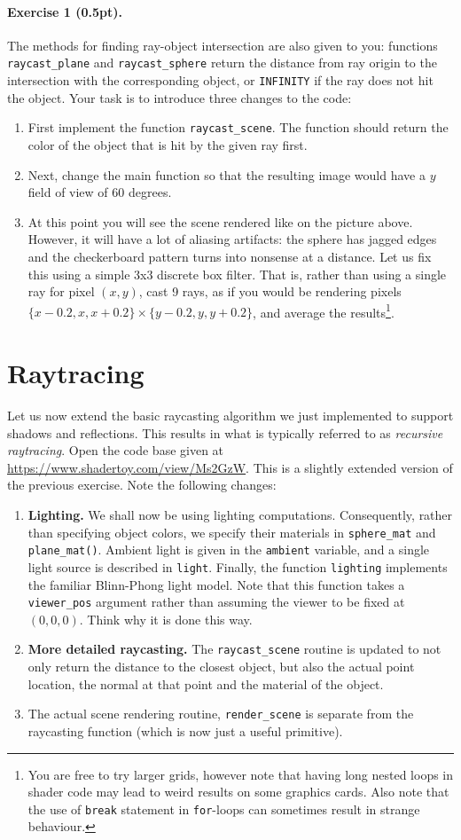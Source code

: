 \documentclass{article}
\newenvironment{exercise}[2]{\paragraph{Exercise #1 (#2pt).} }{
\medskip}
\begin{document}
\begin{exercise}{1}{0.5}
The methods for finding ray-object intersection are also given to you: functions \verb#raycast_plane# and \verb#raycast_sphere# return the distance from ray origin to the intersection with the corresponding object, or \verb#INFINITY# if the ray does not hit the object. Your task is to introduce three changes to the code:
\begin{enumerate}
\item First implement the function \verb#raycast_scene#. The function should return the color of the object that is hit by the given ray first.
\item Next, change the main function so that the resulting image would have a $y$ field of view of 60 degrees.
\item At this point you will see the scene rendered like on the picture above. However, it will have a lot of aliasing artifacts: the sphere has jagged edges and the checkerboard pattern turns into nonsense at a distance. Let us fix this using a simple 3x3 discrete box filter. That is, rather than using a single ray for pixel $(x,y)$, cast 9 rays, as if you would be rendering pixels $\{x-0.2, x, x+0.2\}\times\{y-0.2, y, y+0.2\}$, and average the results\footnote{You are free to try larger grids, however note that having long nested loops in shader code may lead to weird results on some graphics cards. Also note that the use of \texttt{break} statement in \texttt{for}-loops can sometimes result in strange behaviour.}. 
\end{enumerate}
\end{exercise}

\section{Raytracing}
Let us now extend the basic raycasting algorithm we just implemented to support shadows and reflections. This results in what is typically referred to as \emph{recursive raytracing}. Open the code base given at \url{https://www.shadertoy.com/view/Ms2GzW}. This is a slightly extended version of the previous exercise. Note the following changes:
\begin{enumerate}
\item \textbf{Lighting.}  We shall now be using lighting computations. Consequently, rather than specifying object colors, we specify their materials in \verb#sphere_mat# and \verb#plane_mat()#. Ambient light is given in the \verb#ambient# variable, and a single light source is described in \verb#light#.
Finally, the function \verb#lighting# implements the familiar Blinn-Phong light model. Note that this function takes a \verb#viewer_pos# argument rather than assuming the viewer to be fixed at $(0, 0, 0)$. Think why it is done this way.
\item \textbf{More detailed raycasting.} The \verb#raycast_scene# routine is updated to not only return the distance to the closest object, but also the actual point location, the normal at that point and the material of the object.
\item The actual scene rendering routine, \verb#render_scene# is separate from the raycasting function (which is now just a useful primitive).
\end{enumerate}
\end{document}
